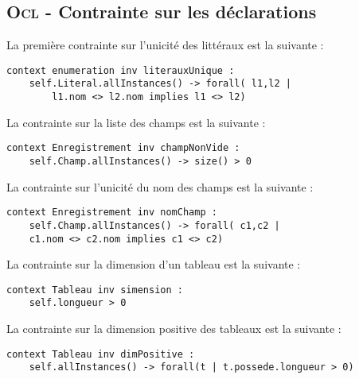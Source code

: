 
\subsection{\textsc{Ocl} - Contrainte sur les déclarations}
\label{sec:question15}

La première contrainte sur l'unicité des littéraux est la suivante :

\begin{lstlisting}[caption=unicité des littéraux,captionpos=b,label={lst:lit_unique},language=OCL]
context enumeration inv literauxUnique :
	self.Literal.allInstances() -> forall( l1,l2 | 
		l1.nom <> l2.nom implies l1 <> l2)
\end{lstlisting}

La contrainte sur la liste des champs est la suivante :

\begin{lstlisting}[caption=champ non vide,captionpos=b,label={lst:champ},language=OCL]
context Enregistrement inv champNonVide :
	self.Champ.allInstances() -> size() > 0
\end{lstlisting}

La contrainte sur l'unicité du nom des champs est la suivante :

\begin{lstlisting}[caption=Nom unique des champs,captionpos=b,label={lst:champ_unique},language=OCL]
context Enregistrement inv nomChamp :
	self.Champ.allInstances() -> forall( c1,c2 | 
	c1.nom <> c2.nom implies c1 <> c2)
\end{lstlisting}

La contrainte sur la dimension d'un tableau est la suivante :

\begin{lstlisting}[caption=dimension d'un tableau,captionpos=b,label={lst:dim_tableau},language=OCL]
context Tableau inv simension :
	self.longueur > 0
\end{lstlisting}

La contrainte sur la dimension positive des tableaux est la suivante :

\begin{lstlisting}[caption=Dimension positive,captionpos=b,label={lst:dim_positive},language=OCL]
context Tableau inv dimPositive :
	self.allInstances() -> forall(t | t.possede.longueur > 0)
\end{lstlisting}